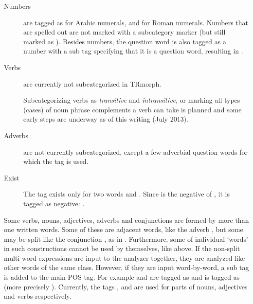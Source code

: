 \documentclass[twocolumn]{article}
\begin{document}
\begin{description}
\item[Numbers] are tagged as  for Arabic numerals,
and  for Roman numerals. Numbers that are spelled
out are not marked with a subcategory marker (but still marked as
). Besides numbers, the question word 
is also tagged as a number with a sub tag specifying that it is a
question word, resulting in .

\item[Verbs] are currently not subcategorized in TRmorph. 

Subcategorizing verbs as \emph{transitive} and \emph{intransitive}, or
marking all types (cases) of noun phrase complements a verb can take
is planned and some early steps are underway as of this writing (July
2013).
\item[Adverbs] are not currently subcategorized, except a few adverbial
question words for which the tag  is used.

\item[Exist] The tag  exists only for two words
 and  . 
Since  is the negative of , it is tagged as
negative: .
\end{description}

Some verbs, nouns, adjectives, adverbs and conjunctions are formed by
more than one written words. Some of these are adjacent words, like
the adverb , but some may be split like
the conjunction , as in . Furthermore, some of individual
`words' in such constructions cannot be used by themselves, like
 above. If the non-split multi-word expressions are input
to the analyzer together, they are analyzed like other words of the
same class. However, if they are input word-by-word, a sub tag
 is added to the main POS tag. For example
 and  are tagged as  and
 is tagged as  (more precisely
). Currently, the tags
,  and
 are used for parts of nouns, adjectives and
verbs respectively.
\end{document}
